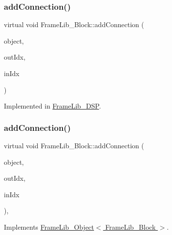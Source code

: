 \subsubsection{\texorpdfstring{add\+Connection()}{addConnection()}\hspace{0.1cm}{\footnotesize\ttfamily [1/2]}}
{\footnotesize\ttfamily virtual void Frame\+Lib\+\_\+\+Block\+::add\+Connection (\begin{DoxyParamCaption}\item[{class \hyperlink{class_frame_lib___d_s_p}{Frame\+Lib\+\_\+\+D\+SP} $\ast$}]{object,  }\item[{unsigned long}]{out\+Idx,  }\item[{unsigned long}]{in\+Idx }\end{DoxyParamCaption})\hspace{0.3cm}{\ttfamily [pure virtual]}}



Implemented in \hyperlink{class_frame_lib___d_s_p_a835fc24bc4224279fa53b15bde7a824f}{Frame\+Lib\+\_\+\+D\+SP}.

\mbox{\label{class_frame_lib___block_a88e998ec661b9afd001e40e68bb52f61}} 
\subsubsection{\texorpdfstring{add\+Connection()}{addConnection()}\hspace{0.1cm}{\footnotesize\ttfamily [2/2]}}
{\footnotesize\ttfamily virtual void Frame\+Lib\+\_\+\+Block\+::add\+Connection (\begin{DoxyParamCaption}\item[{\hyperlink{class_frame_lib___block}{Frame\+Lib\+\_\+\+Block} $\ast$}]{object,  }\item[{unsigned long}]{out\+Idx,  }\item[{unsigned long}]{in\+Idx }\end{DoxyParamCaption})\hspace{0.3cm}{\ttfamily [inline]}, {\ttfamily [virtual]}}



Implements \hyperlink{class_frame_lib___object_ab276c500466359bb43494ff2b7c94cc6}{Frame\+Lib\+\_\+\+Object$<$ Frame\+Lib\+\_\+\+Block $>$}.

